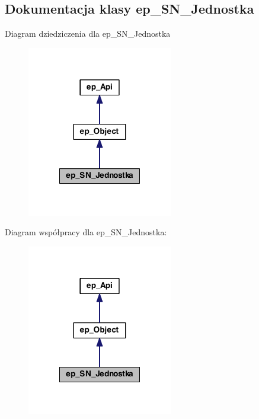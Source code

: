 \hypertarget{classep___s_n___jednostka}{\subsection{Dokumentacja klasy ep\-\_\-\-S\-N\-\_\-\-Jednostka}
\label{classep___s_n___jednostka}
}


Diagram dziedziczenia dla ep\-\_\-\-S\-N\-\_\-\-Jednostka\nopagebreak
\begin{figure}[H]
\begin{center}
\leavevmode
\includegraphics[width=180pt]{classep___s_n___jednostka__inherit__graph}
\end{center}
\end{figure}


Diagram współpracy dla ep\-\_\-\-S\-N\-\_\-\-Jednostka\-:\nopagebreak
\begin{figure}[H]
\begin{center}
\leavevmode
\includegraphics[width=180pt]{classep___s_n___jednostka__coll__graph}
\end{center}
\end{figure}
